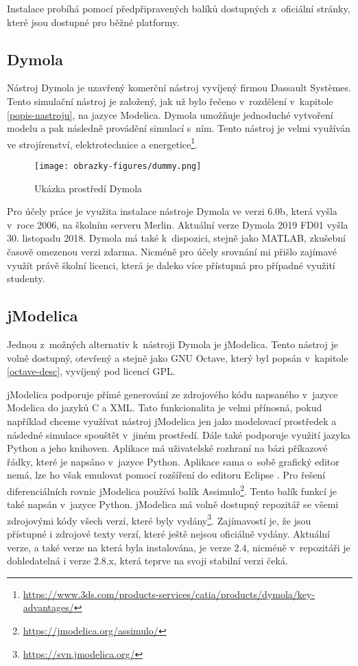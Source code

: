 Instalace probíhá pomocí předpřipravených balíků dostupných z~oficiální stránky, které jsou dostupné pro běžné platformy.

\subsection{Dymola}
\label{dymola-desc}

Nástroj Dymola je uzavřený komerční nástroj vyvíjený firmou Dassault Systèmes. Tento simulační nástroj je založený, jak už bylo řečeno v~rozdělení v~kapitole \ref{popis-nastroju}, na jazyce Modelica. Dymola umožňuje jednoduché vytvoření modelu a pak následně provádění simulací s~ním. Tento nástroj je velmi využíván ve strojírenství, elektrotechnice a energetice\footnote{\url{https://www.3ds.com/products-services/catia/products/dymola/key-advantages/}}.

\begin{figure}[ht]
    \centering
    \texttt{[image: obrazky-figures/dummy.png]}
    \caption{Ukázka prostředí Dymola}
    \label{fig:dymola}
\end{figure}

Pro účely práce je využita instalace nástroje Dymola ve verzi 6.0b, která vyšla v~roce 2006, na školním serveru Merlin. Aktuální verze Dymola 2019 FD01 vyšla 30. listopadu 2018. Dymola má také k~dispozici, stejně jako MATLAB, zkušební časově omezenou verzi zdarma. Nicméně pro účely srovnání mi přišlo zajímavé využít právě školní licenci, která je daleko více přístupná pro případné využití studenty.


\subsection{jModelica}
\label{jmodelica}
Jednou z~možných alternativ k~nástroji Dymola je jModelica. Tento nástroj je volně dostupný, otevřený a stejně jako GNU Octave, který byl popsán v~kapitole \ref{octave-desc}, vyvíjený pod licencí GPL.

jModelica podporuje přímé generování ze zdrojového kódu napsaného v~jazyce Modelica do jazyků C a XML. Tato funkcionalita je velmi přínosná, pokud například chceme využívat nástroj jModelica jen jako modelovací prostředek a následné simulace spouštět v~jiném prostředí. Dále také podporuje využití jazyka Python a jeho knihoven. Aplikace má uživatelské rozhraní na bázi příkazové řádky, které je napsáno v~jazyce Python. Aplikace sama o~sobě grafický editor nemá, lze ho však emulovat pomocí rozšíření do editoru Eclipse \cite{modelica-example}. Pro řešení diferenciálních rovnic jModelica používá balík Assimulo\footnote{\url{https://jmodelica.org/assimulo/}}. Tento balík funkcí je také napsán v~jazyce Python.
jModelica má volně dostupný repozitář se všemi zdrojovými kódy všech verzí, které byly vydány\footnote{\url{https://svn.jmodelica.org/}}. Zajímavostí je, že jsou přístupné i zdrojové texty verzí, které ještě nejsou oficiálně vydány. Aktuální verze, a také verze na která byla instalována, je verze 2.4, nicméně v~repozitáři je dohledatelná i verze 2.8.x, která teprve na svoji stabilní verzi čeká.

